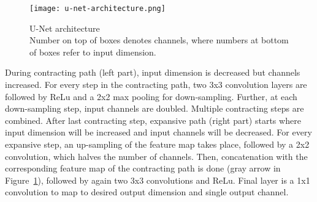\begin{figure}[H]
  \centering
  \texttt{[image: u-net-architecture.png]}
  \caption{
    U-Net architecture \cite[p 2, Fig. 1]{unet-tomography} \\
    Number on top of boxes denotes channels, where numbers at bottom of boxes refer to input dimension.
    }
    \label{fig:u-net-architectue}
\end{figure}


During contracting path (left part), input dimension is decreased but channels increased.
For every step in the contracting path, two 3x3 convolution layers are followed by ReLu
and a 2x2 max pooling for down-sampling. Further, at each down-sampling step, input channels are doubled.
Multiple contracting steps are combined. After last contracting step, expansive path (right part) starts
where input dimension will be increased and input channels will be decreased.
For every expansive step, an up-sampling of the feature map takes place, followed by a 2x2 convolution, 
which halves the number of channels. Then, concatenation with the corresponding feature
map of the contracting path is done (gray arrow in Figure~\ref{fig:u-net-architectue}), followed by again two 3x3 convolutions and ReLu.
Final layer is a 1x1 convolution to map to desired output dimension and single output channel.

